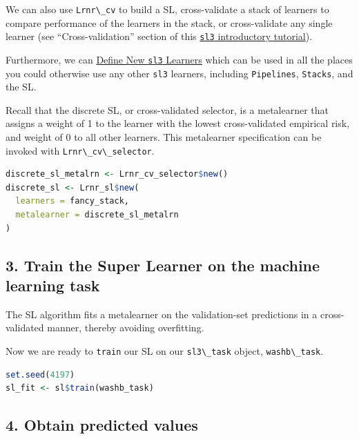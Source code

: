 \documentclass[
  12pt, krantz2,
]{krantz}
\newcommand{\passthrough}[1]{#1}
\newcommand{\1}{\mathbbm{1}}
\theoremstyle{definition}
\theoremstyle{definition}
\theoremstyle{definition}
\theoremstyle{definition}
\theoremstyle{remark}
\begin{document}
We can also use \passthrough{\lstinline!Lrnr\_cv!} to build a SL, cross-validate a stack of
learners to compare performance of the learners in the stack, or cross-validate
any single learner (see ``Cross-validation'' section of this \href{https://tlverse.org/sl3/articles/intro_sl3.html}{\passthrough{\lstinline!sl3!}
introductory tutorial}).

Furthermore, we can \href{https://tlverse.org/sl3/articles/custom_lrnrs.html}{Define New \passthrough{\lstinline!sl3!}
Learners} which can be used
in all the places you could otherwise use any other \passthrough{\lstinline!sl3!} learners, including
\passthrough{\lstinline!Pipelines!}, \passthrough{\lstinline!Stacks!}, and the SL.

Recall that the discrete SL, or cross-validated selector, is a metalearner that
assigns a weight of 1 to the learner with the lowest cross-validated empirical
risk, and weight of 0 to all other learners. This metalearner specification can
be invoked with \passthrough{\lstinline!Lrnr\_cv\_selector!}.

\begin{lstlisting}[language=R]
discrete_sl_metalrn <- Lrnr_cv_selector$new()
discrete_sl <- Lrnr_sl$new(
  learners = fancy_stack,
  metalearner = discrete_sl_metalrn
)
\end{lstlisting}

\hypertarget{train-the-super-learner-on-the-machine-learning-task}{%
\subsection*{3. Train the Super Learner on the machine learning task}\label{train-the-super-learner-on-the-machine-learning-task}}


The SL algorithm fits a metalearner on the validation-set predictions in a
cross-validated manner, thereby avoiding overfitting.

Now we are ready to \passthrough{\lstinline!train!} our SL on our \passthrough{\lstinline!sl3\_task!} object, \passthrough{\lstinline!washb\_task!}.

\begin{lstlisting}[language=R]
set.seed(4197)
sl_fit <- sl$train(washb_task)
\end{lstlisting}

\hypertarget{obtain-predicted-values}{%
\subsection*{4. Obtain predicted values}\label{obtain-predicted-values}}
\end{document}
